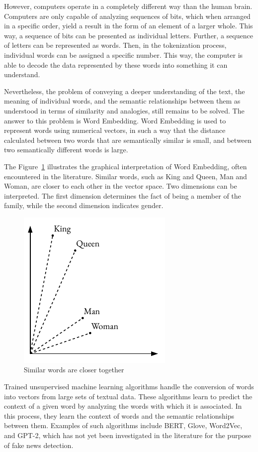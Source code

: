 However, computers operate in a completely different way than the human brain. Computers are only capable of analyzing sequences of bits, which when arranged in a specific order, yield a result in the form of an element of a larger whole. This way, a sequence of bits can be presented as individual letters. Further, a sequence of letters can be represented as words. Then, in the tokenization process, individual words can be assigned a specific number. This way, the computer is able to decode the data represented by these words into something it can understand.

Nevertheless, the problem of conveying a deeper understanding of the text, the meaning of individual words, and the semantic relationships between them as understood in terms of similarity and analogies, still remains to be solved. The answer to this problem is Word Embedding. Word Embedding is used to represent words using numerical vectors, in such a way that the distance calculated between two words that are semantically similar is small, and between two semantically different words is large.

The Figure~\ref{embedding_example} illustrates the graphical interpretation of Word Embedding, often encountered in the literature. Similar words, such as King and Queen, Man and Woman, are closer to each other in the vector space. Two dimensions can be interpreted. The first dimension determines the fact of being a member of the family, while the second dimension indicates gender.

\begin{figure}[hbt!]
\centering
\includegraphics[width=0.4\linewidth]{embedding_example.pdf}
\caption{Similar words are closer together}
\label{embedding_example}
\end{figure}

Trained unsupervised machine learning algorithms handle the conversion of words into vectors from large sets of textual data. These algorithms learn to predict the context of a given word by analyzing the words with which it is associated. In this process, they learn the context of words and the semantic relationships between them. Examples of such algorithms include BERT, Glove, Word2Vec, and GPT-2, which has not yet been investigated in the literature for the purpose of fake news detection.

